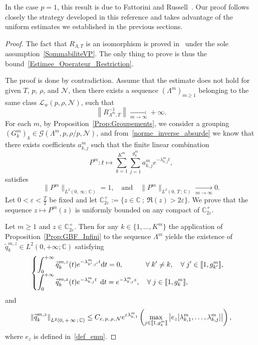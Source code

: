 \documentclass[10pt]{amsart}
\theoremstyle{definition}\newtheorem{defi}[theo]{Definition}\newtheorem{rema}[theo]{Remark}\newtheorem{exam}[theo]{Example}\newtheorem{exem}[theo]{Example}\newtheorem{nota}[theo]{Notation}
\newcommand{\llbracket}{\mathopen{[\mkern -2.7mu[}}
\newcommand{\rrbracket}{\mathclose{]\mkern -2.7mu]}}
\newcommand{\inter}[2]{\llbracket #1,#2 \rrbracket}
\newcommand{\n}{g}
\newcommand{\LL}{\mathcal{L}}
\newcommand{\NN}{\mathcal{N}}
\newcommand{\C}{\mathbb{C}}
\newcommand{\Cpeps}{\mathbb{C}^+_{2\varepsilon}}
\newcommand{\md}{\mathrm{d}}
\let\oldforall\forall
\renewcommand*{\forall}{\mathrel{\oldforall}}
\begin{document}
In the case $p=1$, this result is due to Fattorini and Russell~\cite[Theorem~1.3]{FattoriniRussell74}. Our proof follows closely the strategy developed in this reference and takes advantage of the uniform estimates we established in the previous sections.



\begin{proof}
The fact that $R_{\Lambda,T}$ is an isomorphism is proved in~\cite{SchwartzThese} under the sole assumption~\eqref{SommabiliteVP}. The only thing to prove is thus the bound~\eqref{Estimee_Operateur_Restriction}.

The proof is done by contradiction. Assume that the estimate does not hold for given $T$, $p$, $\rho$, and $\NN$, then there exists a sequence $(\Lambda^m)_{m \geq 1}$ belonging to the same class $\LL_w(p,\rho,\NN)$, such that
\begin{equation}\label{norme_inverse_absurde}
\left\|R_{\Lambda^m,T}^{-1}\right\| \xrightarrow[m\to \infty]{} +\infty.
\end{equation}
For each $m$, by Proposition~\ref{Prop:Groupements}, we consider a grouping $(G^m_k)_k\in \mathcal{G}(\Lambda^m,p,\rho/p,\NN)$, and from~\eqref{norme_inverse_absurde} we know that there exists coefficients $a_{k,j}^m$ such that the finite linear combination
\[
P^m : t \mapsto \sum_{k=1}^{K^m} \sum_{j=1}^{\n_k^m} a_{k,j}^m e^{-\lambda^m_{k,j} t},
\]
satisfies
\[
\|P^m\|_{L^2(0,\,\infty\,;\,\C)} = 1,
\quad \text{and} \quad
\|P^m\|_{L^2(0,\,T\,;\,\C)} \xrightarrow[m\to \infty]{} 0.
\]
Let $0 < \varepsilon < \frac{T}{2}$ be fixed and let $\Cpeps := \{z \in \C \: ; \: \Re(z)>2\varepsilon\}$. We prove that the sequence $z\mapsto P^m(z)$ is uniformly bounded on any compact of $\Cpeps$.

Let $m \geq 1$ and $z \in \Cpeps$. Then for any $k \in \{1, \dots, K^m \}$ the application of Proposition~\ref{Prop:GBF_Infini} to the sequence $\Lambda^m$ yields the existence of $\widetilde{q}_k^{m,z}\in L^2(0,+\infty;\C)$ satisfying
\begin{equation}\label{equations_qkmz}
\begin{cases}
\displaystyle\int_0^{+\infty} \widetilde{q}_k^{m,z}(t) e^{-\lambda^m_{k',j'} t} \md t = 0, \mkern58mu \forall k' \neq k, \quad \forall j'\in \inter{1}{\n^m_{k'}},
\\
\displaystyle\int_0^{+\infty} \widetilde{q}_k^{m,z}(t) e^{-\lambda^m_{k,j} t} \;\,\md t = e^{-\lambda^m_{k,j} z}, \quad \forall j \in \inter{1}{\n^m_k},
\end{cases}
\end{equation}
and
\[
\left\| \widetilde{q}_k^{m,z} \right\|_{L^2(0,\,+\,\infty\,;\,\C)} \leq C_{\varepsilon,\,p,\,\rho,\,\NN} e^{ \varepsilon \lambda^m_{k,1}} \left(\max_{j\in \inter{1}{\n^m_k}} \left| e_z[\lambda^m_{k,1},\dotsc,\lambda^m_{k,j}] \right| \right),
\]
where $e_z$ is defined in~\eqref{def_emu}.



\end{proof}
\end{document}
